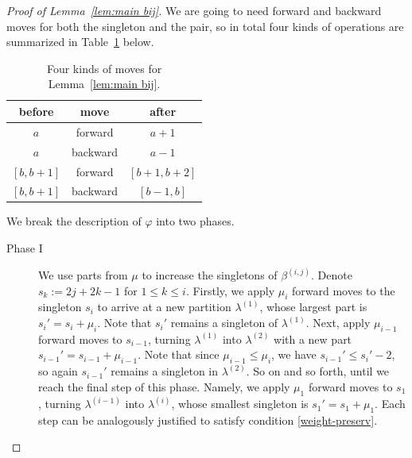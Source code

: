 \documentclass[11pt,reqno]{amsart}
\numberwithin{equation}{section}
\theoremstyle{plain}
\theoremstyle{definition}
\def\la{\lambda}
\begin{document}
\begin{proof}[Proof of Lemma~\ref{lem:main bij}]
We are going to need forward and backward moves for both the singleton and the pair, so in total four kinds of operations are summarized in Table~\ref{tab:4moves} below.

\begin{table}[h!]
\centering
\begin{tabular}{|c|c|c|}
\hline
before & move & after\\
\hline
$a$ & forward & $a+1$ \\
$a$ & backward & $a-1$ \\
$[b,b+1]$ & forward & $[b+1,b+2]$ \\
$[b,b+1]$ & backward & $[b-1,b]$ \\
\hline
\end{tabular}
\medskip
\caption{Four kinds of moves for Lemma~\ref{lem:main bij}.}\label{tab:4moves}
\end{table}

We break the description of $\varphi$ into two phases.
\begin{description}
  \item[Phase I] We use parts from $\mu$ to increase the singletons of $\beta^{(i,j)}$. Denote $s_k:=2j+2k-1$ for $1\le k\le i$. Firstly, we apply $\mu_i$ forward moves to the singleton $s_i$ to arrive at a new partition $\la^{(1)}$, whose largest part is $s_i'=s_i+\mu_i$. Note that $s_i'$ remains a singleton of $\la^{(1)}$. Next, apply $\mu_{i-1}$ forward moves to $s_{i-1}$, turning $\la^{(1)}$ into $\la^{(2)}$ with a new part $s_{i-1}'=s_{i-1}+\mu_{i-1}$. Note that since $\mu_{i-1}\le\mu_i$, we have $s_{i-1}'\le s_i'-2$, so again $s_{i-1}'$ remains a singleton in $\la^{(2)}$. So on and so forth, until we reach the final step of this phase. Namely, we apply $\mu_1$ forward moves to $s_1$, turning $\la^{(i-1)}$ into $\la^{(i)}$, whose smallest singleton is $s_1'=s_1+\mu_1$. Each step can be analogously justified to satisfy condition \eqref{weight-preserv}.


\end{description}
\end{proof}
\end{document}
